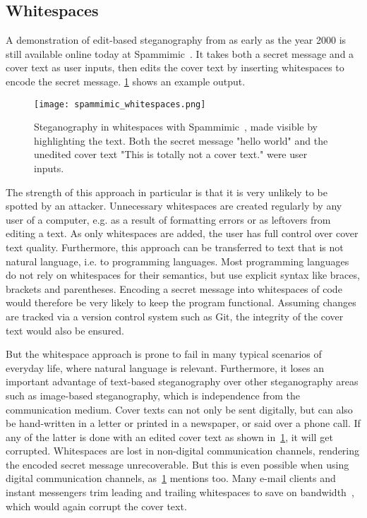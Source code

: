 \subsection{Whitespaces}
\label{sec:whitespaces}
A demonstration of edit-based steganography from as early as the year 2000 is still available online today at Spammimic~\cite{spammimicSpammimic2000,dembartEndUserHide2001,bennettLinguisticSteganographySurvey2004}. It takes both a secret message and a cover text as user inputs, then edits the cover text by inserting whitespaces to encode the secret message. \cref{fig:spammimicWhitespaces} shows an example output.

\begin{figure}
    \begin{wide}
        \centering
        \captionsetup{width=\linewidth}
        \texttt{[image: spammimic\_whitespaces.png]}
        \caption[Spammimic: Whitespaces]{Steganography in whitespaces with Spammimic~\cite{spammimicSpammimic2000}, made visible by highlighting the text. Both the secret message "hello world" and the unedited cover text "This is totally not a cover text." were user inputs.}
        \label{fig:spammimicWhitespaces}
    \end{wide}
\end{figure}

The strength of this approach in particular is that it is very unlikely to be spotted by an attacker. Unnecessary whitespaces are created regularly by any user of a computer, e.g. as a result of formatting errors or as leftovers from editing a text. As only whitespaces are added, the user has full control over cover text quality. Furthermore, this approach can be transferred to text that is not natural language, i.e. to programming languages. Most programming languages do not rely on whitespaces for their semantics, but use explicit syntax like braces, brackets and parentheses. Encoding a secret message into whitespaces of code would therefore be very likely to keep the program functional. Assuming changes are tracked via a version control system such as Git, the integrity of the cover text would also be ensured.

But the whitespace approach is prone to fail in many typical scenarios of everyday life, where natural language is relevant. Furthermore, it loses an important advantage of text-based steganography over other steganography areas such as image-based steganography, which is independence from the communication medium. Cover texts can not only be sent digitally, but can also be hand-written in a letter or printed in a newspaper, or said over a phone call. If any of the latter is done with an edited cover text as shown in~\cref{fig:spammimicWhitespaces}, it will get corrupted. Whitespaces are lost in non-digital communication channels, rendering the encoded secret message unrecoverable. But this is even possible when using digital communication channels, as~\cref{fig:spammimicWhitespaces} mentions too. Many e-mail clients and instant messengers trim leading and trailing whitespaces to save on bandwidth~\cite{shirali-shahrezaTextSteganographySMS2007}, which would again corrupt the cover text.

